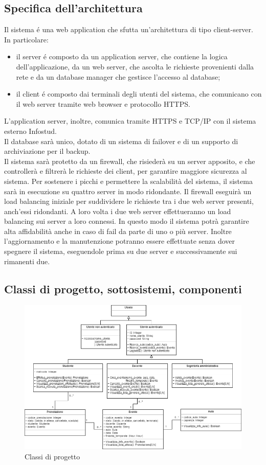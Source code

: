 \documentclass[11pt]{article}
\begin{document}
\subsection{Specifica dell’architettura}
Il sistema é una web application che sfutta un'architettura di tipo client-server. In particolare:
\begin{itemize}
\itemsep0em
\item il server é composto da un application server, che contiene la logica dell'applicazione, da un web server, che ascolta le richieste provenienti dalla rete e da un database manager che gestisce l'accesso al database;
\item il client é composto dai terminali degli utenti del sistema, che comunicano con il web server tramite web browser e protocollo HTTPS.
\end{itemize}
L'application server, inoltre, comunica tramite HTTPS e TCP/IP con il sistema esterno Infostud.\\
Il database sarà unico, dotato di un sistema di failover e di un supporto di archiviazione per il backup.\\
Il sistema sarà protetto da un firewall, che risiederà su un server apposito, e che controllerà e filtrerà le richieste dei client, per garantire maggiore sicurezza al sistema. Per sostenere i picchi e permettere la scalabilità del sistema, il sistema sarà in esecuzione su quattro server in modo ridondante. Il firewall eseguirà un load balancing iniziale per suddividere le richieste tra i due web server presenti, anch'essi ridondanti. A loro volta i due web server effettueranno un load balancing sui server a loro connessi. In questo modo il sistema potrà garantire alta affidabilità anche in caso di fail da parte di uno o più server. Inoltre l'aggiornamento e la manutenzione potranno essere effettuate senza dover spegnere il sistema, eseguendole prima su due server e successivamente sui rimanenti due.

\subsection{Classi di progetto, sottosistemi, componenti}
\begin{figure}[H]
\centering
\includegraphics[width=1\textwidth]{Classi di progetto.png}
\caption{Classi di progetto}
\end{figure}
\end{document}
